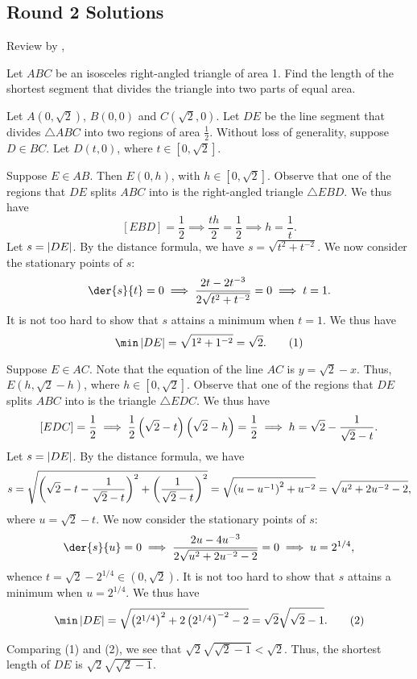 \subsection{Round 2 Solutions}\label{S::2024-J-2}

\begin{resources}
    Review by , 
\end{resources}

\begin{question}\label{Q::2024-J-2-1}
    Let $ABC$ be an isosceles right-angled triangle of area 1. Find the length of the shortest segment that divides the triangle into two parts of equal area.
\end{question}
\begin{solution*}
    Let $A(0, \sqrt{2})$, $B(0, 0)$ and $C(\sqrt2, 0)$. Let $DE$ be the line segment that divides $\triangle ABC$ into two regions of area $\frac12$. Without loss of generality, suppose $D \in BC$. Let $D(t, 0)$, where $t \in [0, \sqrt{2}]$.

     Suppose $E \in AB$. Then $E(0, h)$, with $h \in [0, \sqrt{2}]$. Observe that one of the regions that $DE$ splits $ABC$ into is the right-angled triangle $\triangle EBD$. We thus have \[[EBD] = \frac12 \implies \frac{th}2 = \frac12 \implies h = \frac1{t}.\] Let $s = \left\lvert DE \right\rvert$. By the distance formula, we have $s = \sqrt{t^2 + t^{-2}}$. We now consider the stationary points of $s$: \[\der{s}{t} = 0 \implies \frac{2t - 2t^{-3}}{2\sqrt{t^2 + t^{-2}}} = 0 \implies t = 1.\] It is not too hard to show that $s$ attains a minimum when $t = 1$. We thus have \[\min \abs{DE} = \sqrt{1^2 + 1^{-2}} = \sqrt2. \tag{1}\]

     Suppose $E \in AC$. Note that the equation of the line $AC$ is $y = \sqrt2 -x$. Thus, $E(h, \sqrt2 - h)$, where $h \in [0, \sqrt2]$. Observe that one of the regions that $DE$ splits $ABC$ into is the triangle $\triangle EDC$. We thus have \[[EDC] = \frac12 \implies \frac12 \left( \sqrt2 - t \right)\left( \sqrt2 - h \right) = \frac12 \implies h = \sqrt2 - \frac1{\sqrt2 - t}.\] Let $s = \left\lvert DE \right\rvert$. By the distance formula, we have \[s = \sqrt{\left( \sqrt2 - t - \frac1{\sqrt2 - t} \right)^2 + \left( \frac1{\sqrt2 - t} \right)^2} = \sqrt{\left( u - u^{-1} \right)^2 + u^{-2}} = \sqrt{u^2 + 2u^{-2} - 2},\] where $u = \sqrt2 - t$. We now consider the stationary points of $s$: \[\der{s}{u} = 0 \implies \frac{2u - 4u^{-3}}{2\sqrt{u^2 + 2u^{-2} - 2}} = 0 \implies u = 2^{1/4},\] whence $t = \sqrt2 - 2^{1/4} \in (0, \sqrt2)$. It is not too hard to show that $s$ attains a minimum when $u = 2^{1/4}$. We thus have \[\min \abs{DE} = \sqrt{\bp{2^{1/4}}^2 + 2\bp{2^{1/4}}^{-2} - 2} = \sqrt{2}\sqrt{\sqrt{2} - 1}.\tag{2}\]

    Comparing (1) and (2), we see that $\sqrt2 \sqrt{\sqrt{2} - 1} < \sqrt 2$. Thus, the shortest length of $DE$ is $\sqrt{2} \sqrt{\sqrt2 - 1}$.
\end{solution*}

